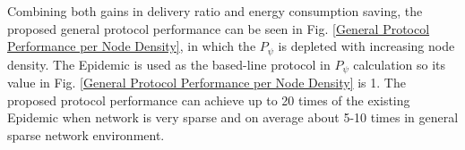 \documentclass[conference]{IEEEtran}
\begin{document}
Combining both gains in delivery ratio and energy consumption saving, the proposed general protocol performance can be seen in Fig. \ref{General Protocol Performance per Node Density}, in which the $P_{\psi}$ is depleted with increasing node density. 
%
The Epidemic is used as the based-line protocol in $P_{\psi}$ calculation so its value in Fig. \ref{General Protocol Performance per Node Density} is 1.
%
The proposed protocol performance can achieve up to 20 times of the existing Epidemic when network is very sparse and on average about 5-10 times in general sparse network environment.

\end{document}
